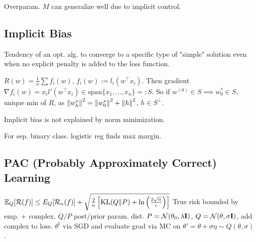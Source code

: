 \begin{definition}[Corollary]
\end{definition}

\begin{definition}
    Overparam. \(M\) can generalize  well due to {\color{H2}implicit control}.
\end{definition}

\subsection{{\color{H2}Implicit} Bias}
Tendency of an opt. alg. to converge to a specific type of "simple" solution even when no explicit penalty is added to the loss function.

\begin{theorem}
    \(R(w) = \frac 1 n \sum f_i(w)\), \(f_i(w) := l_i(w^\top x_i)\). Then gradient \(\nabla f_i(w) = x_i l'(w^\top x_i) \in \text{span}\{x_1, \ldots, x_n\} =: S\). So if \(w^{(0)} \in S \implies w_0^* \in S\), unique min of \(R\), as \(\norm{w_h^*}^2 = \norm{w_0^*}^2 + \norm{h}^2\), \(h \in S^\bot\).
\end{theorem}

\begin{theorem}
    Implicit bias is not explained by norm minimization.
\end{theorem}

\begin{theorem}
    For sep. binary class. logistic reg finds max margin.
\end{theorem}

\subsection{PAC (Probably Approximately Correct) Learning}

\begin{theorem}[PAC]
    \(\mathbb{E}_Q[\mathcal{R}(f)] \leq E_Q[\mathcal{R}_n(f)] + \sqrt{\frac 2 n \left[\operatorname{KL}(Q \Vert P) + \ln\left(\frac{2\sqrt{n}}{\epsilon}\right)\right]}\)
    True risk bounded by emp. + complex. \(Q/P\) post/prior param. dist.
    \(P = \operatorname{\mathcal{N}}(\theta_0, \lambda\vb{I})\), \(Q = \operatorname{\mathcal{N}}(\theta, \sigma\vb{I})\), add complex to loss. \(\theta^t\) via SGD and evaluate grad via MC on \(\theta' = \theta + \sigma \eta \sim Q(\theta, \sigma)\).
\end{theorem}

